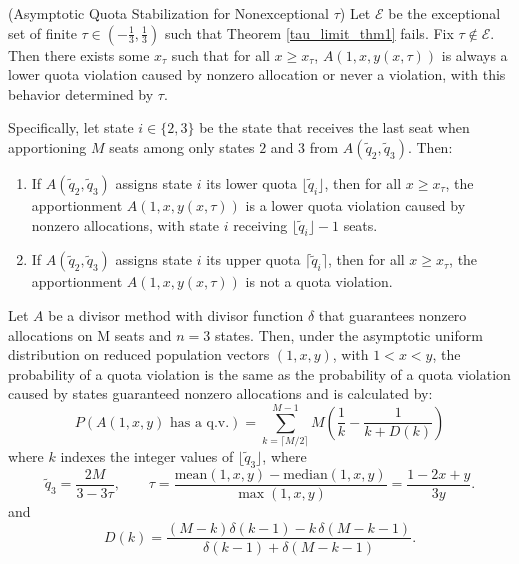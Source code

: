 \documentclass[11pt]{article}
\theoremstyle{definition}
\theoremstyle{definition}
\newenvironment{customthm}[1]
  {\renewcommand\theinnercustomthm{#1}\innercustomthm}
  {\endinnercustomthm}
\begin{document}
\begin{customthm}{\ref{X_tau_def/exist}} (Asymptotic Quota Stabilization for Nonexceptional $\tau$) Let $\mathcal{E}$ be the exceptional set of finite $\tau \in (-\frac 13,\frac 13)$ such that Theorem \ref{tau_limit_thm1} fails. Fix $\tau \notin \mathcal{E}$. Then there exists some $x_\tau$ such that for all $x \geq x_\tau$, $A(1,x,y(x,\tau))$ is always a lower quota violation caused by nonzero allocation or never a violation, with this behavior determined by $\tau$. 

Specifically, let state $i \in \{2,3\}$ be the state that receives the last seat when apportioning $M$ seats among only states $2$ and $3$ from $A(\tilde{q}_2, \tilde{q}_3)$. 
Then: 
\begin{enumerate}
 \item If $A(\tilde{q}_2, \tilde{q}_3)$ assigns state $i$ its lower quota 
 $\lfloor \tilde{q}_i \rfloor$, then for all $x \geq x_\tau$, the apportionment 
 $A(1, x, y(x,\tau))$ is a lower quota violation caused by nonzero allocations, 
 with state $i$ receiving $\lfloor \tilde{q}_i \rfloor - 1$ seats.
 \item If $A(\tilde{q}_2, \tilde{q}_3)$ assigns state $i$ its upper quota 
 $\lceil \tilde{q}_i \rceil$, then for all $x \geq x_\tau$, the apportionment 
 $A(1, x, y(x,\tau))$ is not a quota violation.
\end{enumerate}
\end{customthm}

\begin{customthm}{\ref{prob_sum}} 
 Let $A$ be a divisor method with divisor function $\delta$ that guarantees nonzero allocations on M seats and $n = 3$ states. Then, under the asymptotic uniform distribution on reduced population vectors $(1, x, y)$, with $1<x<y$,  the probability of a quota violation is the same as the probability of a quota violation caused by states guaranteed nonzero allocations and is calculated by:
$$P(A(1,x,y) \text { has a q.v.}) = \sum_{k = \lceil M/2 \rceil}^{M-1} M\left( \frac{1}{k} - \frac{1}{k + D(k)} \right)$$
where $k$ indexes the integer values of $\lfloor \tilde{q}_3 \rfloor$, where 
$$\tilde{q}_3 = \frac{2M}{3-3\tau}, \qquad \tau = \frac{\mathrm{mean}(1,x,y)-\mathrm{median}(1,x,y)}{\max(1,x,y)}=\dfrac{1 - 2x + y}{3y}.$$ and 
$$D(k) =\frac{(M-k)\delta(k-1)-k\,\delta(M-k-1)}{\delta(k-1)+\delta(M-k-1)}.$$
\end{customthm}
\end{document}
